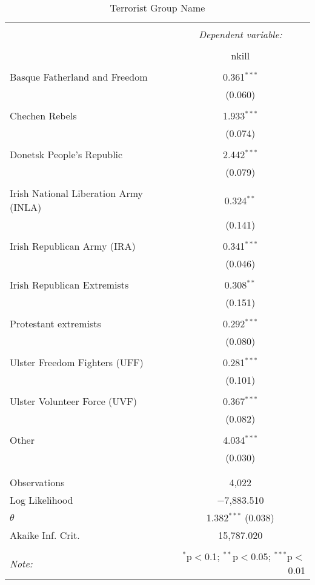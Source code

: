 
\begin{table}[!htbp] \centering 
  \caption{Terrorist Group Name} 
  \label{} 
\begin{tabular}{@{\extracolsep{5pt}}lc} 
\\[-1.8ex]\hline 
\hline \\[-1.8ex] 
 & \multicolumn{1}{c}{\textit{Dependent variable:}} \\ 
\cline{2-2} 
\\[-1.8ex] & nkill \\ 
\hline \\[-1.8ex] 
 Basque Fatherland and Freedom & 0.361$^{***}$ \\ 
  & (0.060) \\ 
  & \\ 
 Chechen Rebels & 1.933$^{***}$ \\ 
  & (0.074) \\ 
  & \\ 
 Donetsk People's Republic & 2.442$^{***}$ \\ 
  & (0.079) \\ 
  & \\ 
 Irish National Liberation Army (INLA) & 0.324$^{**}$ \\ 
  & (0.141) \\ 
  & \\ 
 Irish Republican Army (IRA) & 0.341$^{***}$ \\ 
  & (0.046) \\ 
  & \\ 
 Irish Republican Extremists & 0.308$^{**}$ \\ 
  & (0.151) \\ 
  & \\ 
 Protestant extremists & 0.292$^{***}$ \\ 
  & (0.080) \\ 
  & \\ 
 Ulster Freedom Fighters (UFF) & 0.281$^{***}$ \\ 
  & (0.101) \\ 
  & \\ 
 Ulster Volunteer Force (UVF) & 0.367$^{***}$ \\ 
  & (0.082) \\ 
  & \\ 
 Other & 4.034$^{***}$ \\ 
  & (0.030) \\ 
  & \\ 
\hline \\[-1.8ex] 
Observations & 4,022 \\ 
Log Likelihood & $-$7,883.510 \\ 
$\theta$ & 1.382$^{***}$  (0.038) \\ 
Akaike Inf. Crit. & 15,787.020 \\ 
\hline 
\hline \\[-1.8ex] 
\textit{Note:}  & \multicolumn{1}{r}{$^{*}$p$<$0.1; $^{**}$p$<$0.05; $^{***}$p$<$0.01} \\ 
\end{tabular} 
\end{table} 
